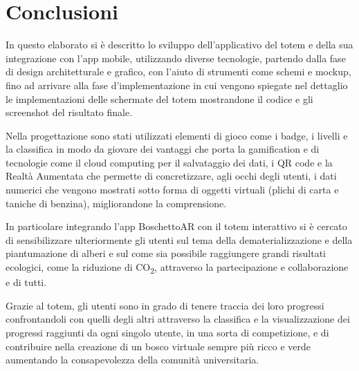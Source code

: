 \chapter{Conclusioni}
In questo elaborato si è descritto lo sviluppo dell'applicativo del totem e della sua integrazione con l'app mobile, utilizzando diverse tecnologie, partendo dalla fase di design architetturale e grafico, con l'aiuto di strumenti come schemi e mockup, fino ad arrivare alla fase d'implementazione in cui vengono spiegate nel dettaglio le implementazioni delle schermate del totem mostrandone il codice e gli screenshot del risultato finale.

Nella progettazione sono stati utilizzati elementi di gioco come i badge, i livelli e la classifica in modo da giovare dei vantaggi che porta la gamification e di tecnologie come il cloud computing per il salvataggio dei dati, i QR code e la Realtà Aumentata che permette di concretizzare, agli occhi degli utenti, i dati numerici che vengono mostrati sotto forma di oggetti virtuali (plichi di carta e taniche di benzina), migliorandone la comprensione.

In particolare integrando l'app BoschettoAR con il totem interattivo si è cercato di sensibilizzare ulteriormente gli utenti sul tema della dematerializzazione e della piantumazione di alberi e sul come sia possibile raggiungere grandi risultati ecologici, come la riduzione di CO\textsubscript{2}, attraverso la partecipazione e collaborazione e di tutti.

Grazie al totem, gli utenti sono in grado di tenere traccia dei loro progressi confrontandoli con quelli degli altri attraverso la classifica e la visualizzazione dei progressi raggiunti da ogni singolo utente, in una sorta di competizione, e di contribuire nella creazione di un bosco virtuale sempre più ricco e verde aumentando la consapevolezza della comunità universitaria.

